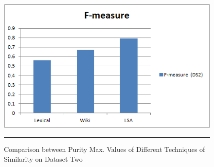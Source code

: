 \begin{figure}[htbp]
	\centering
		\includegraphics{./Figures/F_DS2_1.png}
		\rule{35em}{0.5pt}
	\caption[Comparison between Purity Max. Values of Different Techniques of Similarity on Dataset Two]{Comparison between Purity Max. Values of Different Techniques of Similarity on Dataset Two}
	\label{fig:F15}
\end{figure}

